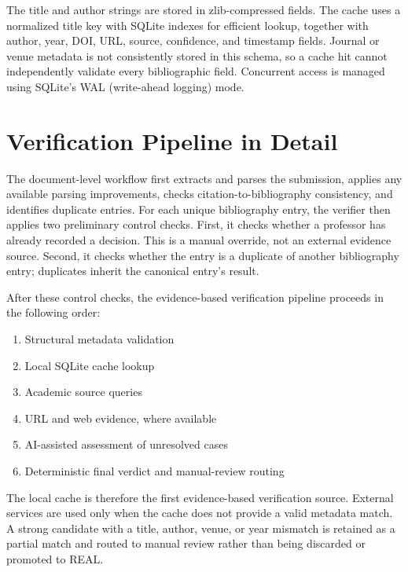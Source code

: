 \documentclass[12pt,a4paper,oneside]{report}
\begin{document}
The title and author strings are stored in zlib-compressed fields. The cache uses a normalized title key with SQLite indexes for efficient lookup, together with author, year, DOI, URL, source, confidence, and timestamp fields. Journal or venue metadata is not consistently stored in this schema, so a cache hit cannot independently validate every bibliographic field. Concurrent access is managed using SQLite's WAL (write-ahead logging) mode.

\section{Verification Pipeline in Detail}

The document-level workflow first extracts and parses the submission, applies any available parsing improvements, checks citation-to-bibliography consistency, and identifies duplicate entries. For each unique bibliography entry, the verifier then applies two preliminary control checks. First, it checks whether a professor has already recorded a decision. This is a manual override, not an external evidence source. Second, it checks whether the entry is a duplicate of another bibliography entry; duplicates inherit the canonical entry's result.

After these control checks, the evidence-based verification pipeline proceeds in the following order:

\begin{enumerate}
    \item Structural metadata validation
    \item Local SQLite cache lookup
    \item Academic source queries
    \item URL and web evidence, where available
    \item AI-assisted assessment of unresolved cases
    \item Deterministic final verdict and manual-review routing
\end{enumerate}

The local cache is therefore the first evidence-based verification source. External services are used only when the cache does not provide a valid metadata match. A strong candidate with a title, author, venue, or year mismatch is retained as a partial match and routed to manual review rather than being discarded or promoted to REAL.
\end{document}
